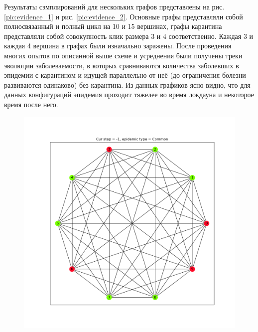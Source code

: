 	Результаты сэмплирований для нескольких графов представлены на рис. \ref{pic:evidence_1} и рис. \ref{pic:evidence_2}. Основные графы представляли собой полносвязанный и полный цикл на 10 и 15 вершинах, графы карантина представляли собой совокупность клик размера 3 и 4 соответственно. Каждая 3 и каждая 4 вершина в графах были изначально заражены. После проведения многих опытов по описанной выше схеме и усреднения были получены треки эволюции заболеваемости, в которых сравниваются количества заболевших в эпидемии с карантином и идущей параллельно от неё (до ограничения болезни развиваются одинаково) без карантина. Из данных графиков ясно видно, что для данных конфигураций эпидемия проходит тяжелее во время локдауна и некоторое время после него.
	
	\begin{figure}[h]
		\begin{center}
			\begin{minipage}{0.49\linewidth}
			\includegraphics[width=\linewidth, keepaspectratio]{../figs/evidence2/init}
			

\end{minipage}
\end{center}
\end{figure}
